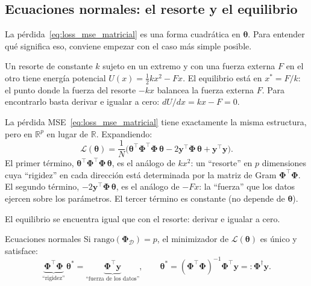 \subsection{Ecuaciones normales: el resorte y el equilibrio}
\label{subsec:ec_normales}

La pérdida~\eqref{eq:loss_mse_matricial} es una forma cuadrática en
$\bm{\theta}$. Para entender qué significa eso, conviene empezar con el
caso más simple posible.

Un resorte de constante $k$ sujeto en un extremo y con una fuerza externa
$F$ en el otro tiene energía potencial $U(x) = \frac{1}{2}kx^2 - Fx$. El
equilibrio está en $x^* = F/k$: el punto donde la fuerza del resorte
$-kx$ balancea la fuerza externa $F$. Para encontrarlo basta derivar e
igualar a cero: $dU/dx = kx - F = 0$.

La pérdida MSE~\eqref{eq:loss_mse_matricial} tiene exactamente la misma
estructura, pero en $\mathbb{R}^p$ en lugar de $\mathbb{R}$. Expandiendo:
\begin{equation}
  \mathcal{L}(\bm{\theta})
  = \frac{1}{N}\bigl(\bm{\theta}^\top\bm{\Phi}^\top\bm{\Phi}\,\bm{\theta}
  - 2\bm{y}^\top\bm{\Phi}\,\bm{\theta}
  + \bm{y}^\top\bm{y}\bigr).
  \label{eq:loss_expandida}
\end{equation}
El primer término, $\bm{\theta}^\top\bm{\Phi}^\top\bm{\Phi}\,\bm{\theta}$,
es el análogo de $kx^2$: un ``resorte'' en $p$ dimensiones cuya ``rigidez''
en cada dirección está determinada por la matriz de Gram
$\bm{\Phi}^\top\bm{\Phi}$. El segundo término,
$-2\bm{y}^\top\bm{\Phi}\,\bm{\theta}$, es el análogo de $-Fx$: la
``fuerza'' que los datos ejercen sobre los parámetros. El tercer término es
constante (no depende de $\bm{\theta}$).

El equilibrio se encuentra igual que con el resorte: derivar e igualar a
cero.

\begin{proposicion}{Ecuaciones normales}
\label{prop:normales}
Si $\mathrm{rango}(\bm{\Phi}_{\mathcal{D}}) = p$, el minimizador de
$\mathcal{L}(\bm{\theta})$ es único y satisface:
\begin{equation}
  \underbrace{\bm{\Phi}^\top\bm{\Phi}}_{\text{``rigidez''}}\,\bm{\theta}^*
  = \underbrace{\bm{\Phi}^\top\bm{y}}_{\text{``fuerza de los datos''}},
  \qquad
  \bm{\theta}^*
  = (\bm{\Phi}^\top\bm{\Phi})^{-1}\bm{\Phi}^\top\bm{y}
  =: \bm{\Phi}^\dagger\bm{y}.
  \label{eq:normales}
\end{equation}
\end{proposicion}

